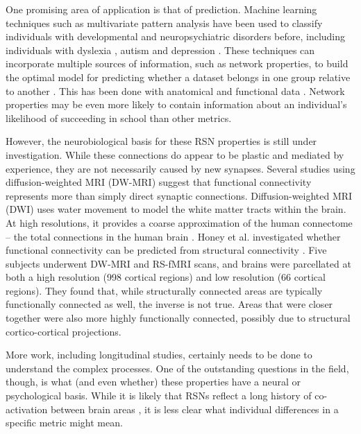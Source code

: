 One promising area of application is that of prediction. Machine learning techniques such as multivariate pattern analysis have been used to classify individuals with developmental and neuropsychiatric disorders before, including individuals with dyslexia \cite{Ecker2010, Hoeft2011, Wee2014, Hoeft2007, Ingalhalikar2014}, autism and depression \cite{Lord2012}.  These techniques can incorporate multiple sources of information, such as network properties, to build the optimal model for predicting whether a dataset belongs in one group relative to another \cite{Pereira2009}. This has been done with anatomical and functional data \cite{Hoeft2007, Hoeft2007b}. Network properties may be even more likely to contain information about an individual's likelihood of succeeding in school than other metrics.

However, the neurobiological basis for these RSN properties is still under investigation. While these connections do appear to be plastic and mediated by experience, they are not necessarily caused by new synapses. Several studies using diffusion-weighted MRI (DW-MRI) suggest that functional connectivity represents more than simply direct synaptic connections. Diffusion-weighted MRI (DWI) uses water movement to model the white matter tracts within the brain. At high resolutions, it provides a coarse approximation of the human connectome -- the total connections in the human brain \cite{Sporns2005}. Honey et al. investigated whether functional connectivity can be predicted from structural connectivity \cite{Honey2009}. Five subjects underwent DW-MRI and RS-fMRI scans, and brains were parcellated at both a high resolution (998 cortical regions) and low resolution (66 cortical regions). They found that, while structurally connected areas are typically functionally connected as well, the inverse is not true. Areas that were closer together were also more highly functionally connected, possibly due to structural cortico-cortical projections. 

More work, including longitudinal studies, certainly needs to be done to understand the complex processes. One of the outstanding questions in the field, though, is what (and even whether) these properties have a neural or psychological basis. While it is likely that RSNs reflect a long history of co-activation between brain areas \cite{Cohen2008, Fair2008}, it is less clear what individual differences in a specific metric might mean.


